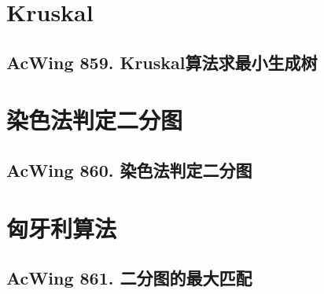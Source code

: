 \section{Kruskal}
\subsection{AcWing 859. Kruskal算法求最小生成树}

\section{染色法判定二分图}
\subsection{AcWing 860. 染色法判定二分图}

\section{匈牙利算法}
\subsection{AcWing 861. 二分图的最大匹配}